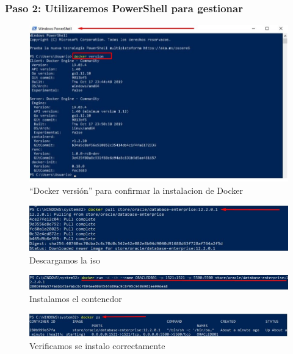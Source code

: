 \documentclass[preprint,12pt]{elsarticle}
\begin{document}
\subsubsection{\textbf{Paso 2: Utilizaremos PowerShell para gestionar}}

\begin{figure}[H]
	\begin{center}
		\includegraphics[width=12cm]{./IMAGENES/foto5} 
		\caption{“Docker versión” para confirmar la instalacion de Docker}
	\end{center}
\end{figure}


\begin{figure}[H]
	\begin{center}
		\includegraphics[width=12cm]{./IMAGENES/foto6} 
		\caption{Descargamos la iso}
	\end{center}
\end{figure}

\begin{figure}[H]
	\begin{center}
		\includegraphics[width=12cm]{./IMAGENES/foto10} 
		\caption{Instalamos el contenedor}
	\end{center}
\end{figure}

\begin{figure}[H]
	\begin{center}
		\includegraphics[width=12cm]{./IMAGENES/foto11} 
		\caption{Verificamos se instalo correctamente}
	\end{center}
\end{figure}
\end{document}
